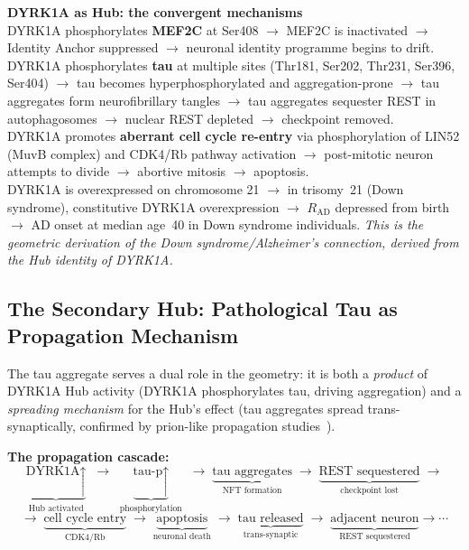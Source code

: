 \documentclass[12pt,a4paper]{article}
\newenvironment{derivenv}{%
  \begin{tcolorbox}[colback=lightgray,colframe=midgray,boxrule=0.5pt,
    arc=3pt,left=8pt,right=8pt,top=6pt,bottom=6pt,breakable]}{%
  \end{tcolorbox}}
\newcommand{\RAD}{R_{\mathrm{AD}}}
\begin{document}
\begin{derivenv}
\textbf{DYRK1A as Hub: the convergent mechanisms}\\[6pt]
DYRK1A phosphorylates \textbf{MEF2C} at Ser408 $\to$
MEF2C is inactivated $\to$ Identity Anchor suppressed
$\to$ neuronal identity programme begins to drift.\\[4pt]

DYRK1A phosphorylates \textbf{tau} at multiple sites
(Thr181, Ser202, Thr231, Ser396, Ser404) $\to$ tau
becomes hyperphosphorylated and aggregation-prone $\to$
tau aggregates form neurofibrillary tangles $\to$
tau aggregates sequester REST in autophagosomes $\to$
nuclear REST depleted $\to$ checkpoint removed.\\[4pt]

DYRK1A promotes \textbf{aberrant cell cycle re-entry}
via phosphorylation of LIN52 (MuvB complex) and
CDK4/Rb pathway activation $\to$ post-mitotic neuron
attempts to divide $\to$ abortive mitosis $\to$
apoptosis.\\[4pt]

DYRK1A is overexpressed on chromosome 21 $\to$ in
trisomy~21 (Down syndrome), constitutive DYRK1A
overexpression $\to$ $\RAD$ depressed from birth $\to$
AD onset at median age~40 in Down syndrome individuals.
\emph{This is the geometric derivation of the Down
syndrome/Alzheimer's connection, derived from the Hub
identity of DYRK1A.}
\end{derivenv}

\subsection{The Secondary Hub: Pathological Tau
as Propagation Mechanism}

The tau aggregate serves a dual role in the geometry:
it is both a \emph{product} of DYRK1A Hub activity
(DYRK1A phosphorylates tau, driving aggregation) and
a \emph{spreading mechanism} for the Hub's effect
(tau aggregates spread trans-synaptically, confirmed
by prion-like propagation studies~\cite{DeCalignon2012}).

\begin{derivenv}
\textbf{The propagation cascade:}
\[
\underbrace{\text{DYRK1A} \uparrow}_{\text{Hub activated}}
\;\longrightarrow\;
\underbrace{\text{tau-p} \uparrow}_{\text{phosphorylation}}
\;\longrightarrow\;
\underbrace{\text{tau aggregates}}_{\text{NFT formation}}
\;\longrightarrow\;
\underbrace{\text{REST sequestered}}_{\text{checkpoint lost}}
\;\longrightarrow\;
\]
\[
\longrightarrow\;
\underbrace{\text{cell cycle entry}}_{\text{CDK4/Rb}}
\;\longrightarrow\;
\underbrace{\text{apoptosis}}_{\text{neuronal death}}
\;\longrightarrow\;
\underbrace{\text{tau released}}_{\text{trans-synaptic}}
\;\longrightarrow\;
\underbrace{\text{adjacent neuron}}_{\text{REST sequestered}}
\longrightarrow \cdots
\]
\end{derivenv}
\end{document}
